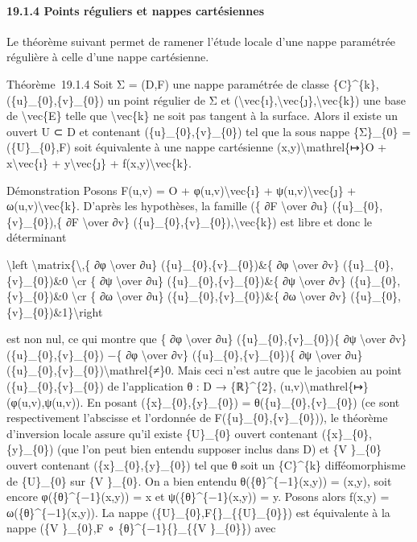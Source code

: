 \documentclass[]{article}
\begin{document}
\paragraph{19.1.4 Points réguliers et nappes cartésiennes}

Le théorème suivant permet de ramener l'étude locale d'une nappe
paramétrée régulière à celle d'une nappe cartésienne.

Théorème~19.1.4 Soit Σ = (D,F) une nappe paramétrée de classe
\{C\}\^{}\{k\}, (\{u\}\_\{0\},\{v\}\_\{0\}) un point régulier de Σ et
(\textbackslash{}vec\{ı\},\textbackslash{}vec\{ȷ\},\textbackslash{}vec\{k\})
une base de \textbackslash{}vec\{E\} telle que \textbackslash{}vec\{k\}
ne soit pas tangent à la surface. Alors il existe un ouvert U ⊂ D et
contenant (\{u\}\_\{0\},\{v\}\_\{0\}) tel que la sous nappe \{Σ\}\_\{0\}
= (\{U\}\_\{0\},F) soit équivalente à une nappe cartésienne
(x,y)\textbackslash{}mathrel\{↦\}O + x\textbackslash{}vec\{ı\} +
y\textbackslash{}vec\{ȷ\} + f(x,y)\textbackslash{}vec\{k\}.

Démonstration Posons F(u,v) = O + φ(u,v)\textbackslash{}vec\{ı\} +
ψ(u,v)\textbackslash{}vec\{ȷ\} + ω(u,v)\textbackslash{}vec\{k\}. D'après
les hypothèses, la famille (\{ ∂F \textbackslash{}over ∂u\}
(\{u\}\_\{0\},\{v\}\_\{0\}),\{ ∂F \textbackslash{}over ∂v\}
(\{u\}\_\{0\},\{v\}\_\{0\}),\textbackslash{}vec\{k\}) est libre et donc
le déterminant

\textbackslash{}left
\textbar{}\textbackslash{}matrix\{\textbackslash{},\{ ∂φ
\textbackslash{}over ∂u\} (\{u\}\_\{0\},\{v\}\_\{0\})\&\{ ∂φ
\textbackslash{}over ∂v\} (\{u\}\_\{0\},\{v\}\_\{0\})\&0
\textbackslash{}cr \{ ∂ψ \textbackslash{}over ∂u\}
(\{u\}\_\{0\},\{v\}\_\{0\})\&\{ ∂ψ \textbackslash{}over ∂v\}
(\{u\}\_\{0\},\{v\}\_\{0\})\&0 \textbackslash{}cr \{ ∂ω
\textbackslash{}over ∂u\} (\{u\}\_\{0\},\{v\}\_\{0\})\&\{ ∂ω
\textbackslash{}over ∂v\}
(\{u\}\_\{0\},\{v\}\_\{0\})\&1\}\textbackslash{}right \textbar{}

est non nul, ce qui montre que \{ ∂φ \textbackslash{}over ∂u\}
(\{u\}\_\{0\},\{v\}\_\{0\})\{ ∂ψ \textbackslash{}over ∂v\}
(\{u\}\_\{0\},\{v\}\_\{0\}) −\{ ∂φ \textbackslash{}over ∂v\}
(\{u\}\_\{0\},\{v\}\_\{0\})\{ ∂ψ \textbackslash{}over ∂u\}
(\{u\}\_\{0\},\{v\}\_\{0\})\textbackslash{}mathrel\{≠\}0. Mais ceci
n'est autre que le jacobien au point (\{u\}\_\{0\},\{v\}\_\{0\}) de
l'application θ : D → \{ℝ\}\^{}\{2\},
(u,v)\textbackslash{}mathrel\{↦\}(φ(u,v),ψ(u,v)). En posant
(\{x\}\_\{0\},\{y\}\_\{0\}) = θ(\{u\}\_\{0\},\{v\}\_\{0\}) (ce sont
respectivement l'abscisse et l'ordonnée de
F(\{u\}\_\{0\},\{v\}\_\{0\})), le théorème d'inversion locale assure
qu'il existe \{U\}\_\{0\} ouvert contenant (\{x\}\_\{0\},\{y\}\_\{0\})
(que l'on peut bien entendu supposer inclus dans D) et \{V \}\_\{0\}
ouvert contenant (\{x\}\_\{0\},\{y\}\_\{0\}) tel que θ soit un
\{C\}\^{}\{k\} difféomorphisme de \{U\}\_\{0\} sur \{V \}\_\{0\}. On a
bien entendu θ(\{θ\}\^{}\{−1\}(x,y)) = (x,y), soit encore
φ(\{θ\}\^{}\{−1\}(x,y)) = x et ψ(\{θ\}\^{}\{−1\}(x,y)) = y. Posons alors
f(x,y) = ω(\{θ\}\^{}\{−1\}(x,y)). La nappe
(\{U\}\_\{0\},F\{\textbar{}\}\_\{\{U\}\_\{0\}\}) est équivalente à la
nappe (\{V \}\_\{0\},F ∘ \{θ\}\^{}\{−1\}\{\textbar{}\}\_\{\{V
\}\_\{0\}\}) avec
\end{document}

